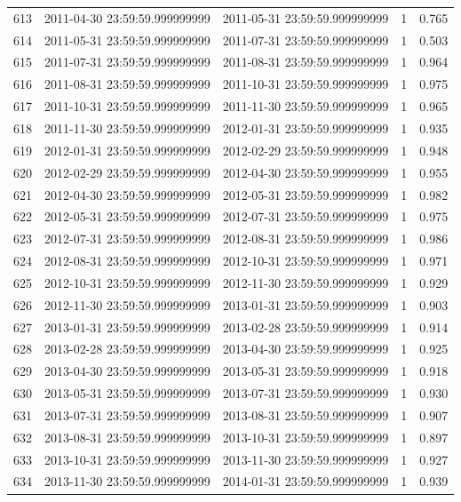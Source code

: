 \begin{table}
\begin{tabular}{lcccc}
613 & 2011-04-30 23:59:59.999999999 & 2011-05-31 23:59:59.999999999 & 1 & 0.765 \\
614 & 2011-05-31 23:59:59.999999999 & 2011-07-31 23:59:59.999999999 & 1 & 0.503 \\
615 & 2011-07-31 23:59:59.999999999 & 2011-08-31 23:59:59.999999999 & 1 & 0.964 \\
616 & 2011-08-31 23:59:59.999999999 & 2011-10-31 23:59:59.999999999 & 1 & 0.975 \\
617 & 2011-10-31 23:59:59.999999999 & 2011-11-30 23:59:59.999999999 & 1 & 0.965 \\
618 & 2011-11-30 23:59:59.999999999 & 2012-01-31 23:59:59.999999999 & 1 & 0.935 \\
619 & 2012-01-31 23:59:59.999999999 & 2012-02-29 23:59:59.999999999 & 1 & 0.948 \\
620 & 2012-02-29 23:59:59.999999999 & 2012-04-30 23:59:59.999999999 & 1 & 0.955 \\
621 & 2012-04-30 23:59:59.999999999 & 2012-05-31 23:59:59.999999999 & 1 & 0.982 \\
622 & 2012-05-31 23:59:59.999999999 & 2012-07-31 23:59:59.999999999 & 1 & 0.975 \\
623 & 2012-07-31 23:59:59.999999999 & 2012-08-31 23:59:59.999999999 & 1 & 0.986 \\
624 & 2012-08-31 23:59:59.999999999 & 2012-10-31 23:59:59.999999999 & 1 & 0.971 \\
625 & 2012-10-31 23:59:59.999999999 & 2012-11-30 23:59:59.999999999 & 1 & 0.929 \\
626 & 2012-11-30 23:59:59.999999999 & 2013-01-31 23:59:59.999999999 & 1 & 0.903 \\
627 & 2013-01-31 23:59:59.999999999 & 2013-02-28 23:59:59.999999999 & 1 & 0.914 \\
628 & 2013-02-28 23:59:59.999999999 & 2013-04-30 23:59:59.999999999 & 1 & 0.925 \\
629 & 2013-04-30 23:59:59.999999999 & 2013-05-31 23:59:59.999999999 & 1 & 0.918 \\
630 & 2013-05-31 23:59:59.999999999 & 2013-07-31 23:59:59.999999999 & 1 & 0.930 \\
631 & 2013-07-31 23:59:59.999999999 & 2013-08-31 23:59:59.999999999 & 1 & 0.907 \\
632 & 2013-08-31 23:59:59.999999999 & 2013-10-31 23:59:59.999999999 & 1 & 0.897 \\
633 & 2013-10-31 23:59:59.999999999 & 2013-11-30 23:59:59.999999999 & 1 & 0.927 \\
634 & 2013-11-30 23:59:59.999999999 & 2014-01-31 23:59:59.999999999 & 1 & 0.939 \\

\end{tabular}
\end{table}
